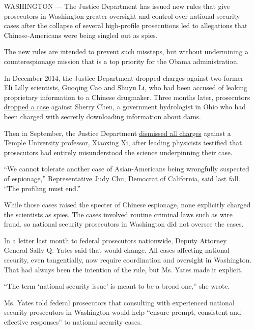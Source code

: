 WASHINGTON --- The Justice Department has issued new rules that give
prosecutors in Washington greater oversight and control over national
security cases after the collapse of several high-profile prosecutions
led to allegations that Chinese-Americans were being singled out as
spies.

The new rules are intended to prevent such missteps, but without
undermining a counterespionage mission that is a top priority for the
Obama administration.

In December 2014, the Justice Department dropped charges against two
former Eli Lilly scientists, Guoqing Cao and Shuyu Li, who had been
accused of leaking proprietary information to a Chinese drugmaker. Three
months later, prosecutors
\href{http://www.nytimes.com/2015/05/10/business/accused-of-spying-for-china-until-she-wasnt.html?_r=0}{dropped
a case} against Sherry Chen, a government hydrologist in Ohio who had
been charged with secretly downloading information about dams.

Then in September, the Justice Department
\href{http://www.nytimes.com/2015/09/12/us/politics/us-drops-charges-that-professor-shared-technology-with-china.html}{dismissed
all charges} against a Temple University professor, Xiaoxing Xi, after
leading physicists testified that prosecutors had entirely misunderstood
the science underpinning their case.

``We cannot tolerate another case of Asian-Americans being wrongfully
suspected of espionage,'' Representative Judy Chu, Democrat of
California, said last fall. ``The profiling must end.''

While those cases raised the specter of Chinese espionage, none
explicitly charged the scientists as spies. The cases involved routine
criminal laws such as wire fraud, so national security prosecutors in
Washington did not oversee the cases.

In a letter last month to federal prosecutors nationwide, Deputy
Attorney General Sally Q. Yates said that would change. All cases
affecting national security, even tangentially, now require coordination
and oversight in Washington. That had always been the intention of the
rule, but Ms. Yates made it explicit.

``The term `national security issue' is meant to be a broad one,'' she
wrote.

Ms. Yates told federal prosecutors that consulting with experienced
national security prosecutors in Washington would help ``ensure prompt,
consistent and effective responses'' to national security cases.

